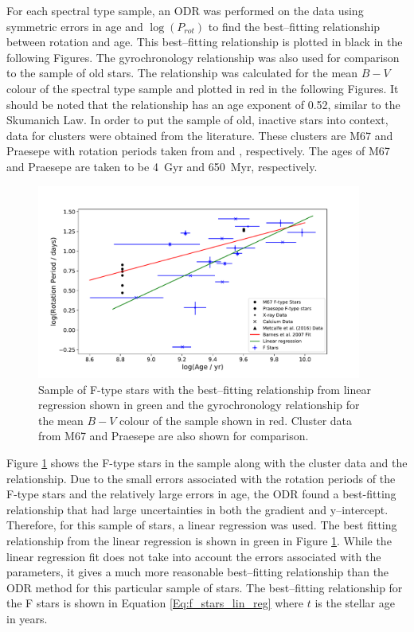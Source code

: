 For each spectral type sample, an ODR was performed on the data using symmetric errors in age and $\log(P_{rot})$ to find the best--fitting relationship between rotation and age. This best--fitting relationship is plotted in black in the following Figures. The \citet{Barnes_2007} gyrochronology relationship was also used for comparison to the sample of old stars. The \citet{Barnes_2007} relationship was calculated for the mean $B-V$ colour of the spectral type sample and plotted in red in the following Figures. It should be noted that the \citet{Barnes_2007} relationship has an age exponent of 0.52, similar to the Skumanich Law. In order to put the sample of old, inactive stars into context, data for clusters were obtained from the literature. These clusters are M67 and Praesepe with rotation periods taken from \citet{Barnes_etal_2016} and \citet{Douglas_etal_2017}, respectively. The ages of M67 and Praesepe are taken to be 4~Gyr and 650~Myr, respectively.

\begin{figure}[!ht]
    \centering
    \includegraphics[width=0.95\textwidth]{Figures/5-Activity_rotation/f_prot_v_age_LR.pdf}
    \caption[Rotation period as a function of age for F-type stars]{Sample of F-type stars with the best--fitting relationship from linear regression shown in green and the \citet{Barnes_2007} gyrochronology relationship for the mean $B-V$ colour of the sample shown in red. Cluster data from M67 and Praesepe are also shown for comparison.}
    \label{fig:f_prot_v_age}
\end{figure}

Figure \ref{fig:f_prot_v_age} shows the F-type stars in the sample along with the cluster data and the \citet{Barnes_2007} relationship. Due to the small errors associated with the rotation periods of the F-type stars and the relatively large errors in age, the ODR found a best-fitting relationship that had large uncertainties in both the gradient and y--intercept. Therefore, for this sample of stars, a linear regression was used. The best fitting relationship from the linear regression is shown in green in Figure \ref{fig:f_prot_v_age}. While the linear regression fit does not take into account the errors associated with the parameters, it gives a much more reasonable best--fitting relationship than the ODR method for this particular sample of stars. The best--fitting relationship for the F stars is shown in Equation \ref{Eq:f_stars_lin_reg} where $t$ is the stellar age in years.


